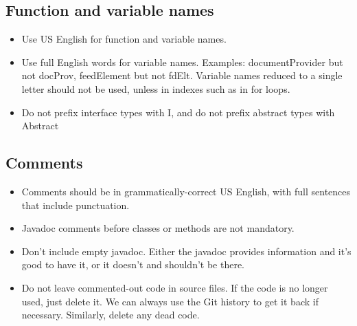 \documentclass[11pt]{book}
\begin{document}
\subsection{Function and variable names}
\begin{itemize}
	\item Use US English for function and variable names.
	\item Use full English words for variable names. Examples: documentProvider but not docProv, feedElement but not fdElt. Variable names reduced to a single letter should not be used, unless in indexes such as in for loops.
	\item Do not prefix interface types with I, and do not prefix abstract types with Abstract
\end{itemize}

\subsection{Comments}
\begin{itemize}
	\item Comments should be in grammatically-correct US English, with full sentences that include punctuation.
	\item Javadoc comments before classes or methods are not mandatory.
	\item Don't include empty javadoc. Either the javadoc provides information and it's good to have it, or it doesn't and shouldn't be there.
	\item Do not leave commented-out code in source files. If the code is no longer used, just delete it. We can always use the Git history to get it back if necessary. Similarly, delete any dead code.
\end{itemize}
\end{document}

